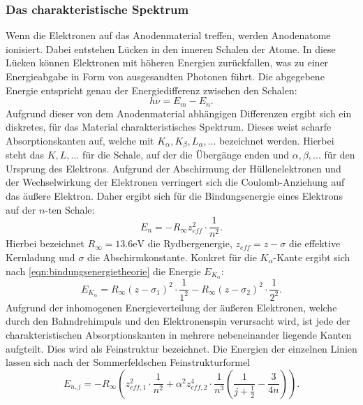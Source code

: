 \subsubsection{Das charakteristische Spektrum}
Wenn die Elektronen auf das Anodenmaterial treffen, werden Anodenatome ionisiert.
Dabei entstehen Lücken in den inneren Schalen der Atome. In diese Lücken können
Elektronen mit höheren Energien zurückfallen, was zu einer Energieabgabe in Form
von ausgesandten Photonen führt. Die abgegebene Energie entspricht genau der
Energiedifferenz zwischen den Schalen:
\begin{equation}
  h \nu = E_m - E_n.
  \label{eqn:absorptionskantentheorie}
\end{equation}
Aufgrund dieser von dem Anodenmaterial abhängigen Differenzen ergibt sich ein
diskretes, für das Material charakteristisches Spektrum. Dieses weist scharfe
Absorptionskanten auf, welche mit $K_{\alpha}, K_{\beta}, L_{\alpha}, ...$
bezeichnet werden. Hierbei steht das $K, L, ...$ für die Schale, auf der die
Übergänge enden und $\alpha, \beta, ...$ für den Ursprung des Elektrons.
Aufgrund der Abschirmung der Hüllenelektronen und der Wechselwirkung der
Elektronen verringert sich die Coulomb-Anziehung auf das äußere Elektron.
Daher ergibt sich für die Bindungsenergie eines Elektrons auf der $n$-ten
Schale:
\begin{equation}
  E_n = -R_{\infty} z_{eff}^2 \cdot \frac{1}{n^2}.
  \label{eqn:bindungsenergietheorie}
\end{equation}
Hierbei bezeichnet $R_{\infty} = 13.6 \si{\electronvolt}$ die Rydbergenergie,
$z_{eff} = z - \sigma$ die effektive Kernladung und $\sigma$ die
Abschirmkonstante. Konkret für die $K_{\alpha}$-Kante ergibt sich nach
\eqref{eqn:bindungsenergietheorie} die Energie $E_{K_\alpha}$:
\begin{equation}
  E_{K_\alpha} = R_{\infty} (z - \sigma_1)^2 \cdot \frac{1}{1^2} - R_{\infty} (z - \sigma_2)^2 \cdot \frac{1}{2^2}.
  \label{eqn:energiekalphatheorie}
\end{equation}
Aufgrund der inhomogenen Energieverteilung der äußeren Elektronen, welche durch
den Bahndrehimpuls und den Elektronenspin verursacht wird, ist jede der
charakteristischen Absorptionskanten in mehrere nebeneinander liegende Kanten
aufgteilt. Dies wird als Feinstruktur bezeichnet. Die Energien der einzelnen
Linien lassen sich nach der Sommerfeldschen Feinstrukturformel
\begin{equation}
  E_{n,j} = -R_{\infty} \left( z_{eff,1}^2 \cdot \frac{1}{n^2} + \alpha^2 z_{eff,2}^4 \cdot \frac{1}{n^3} \left(  \frac{1}{j + \frac{1}{2}} - \frac{3}{4n} \right) \right).
  \label{eqn:sommerfeldtheorie}
\end{equation}

